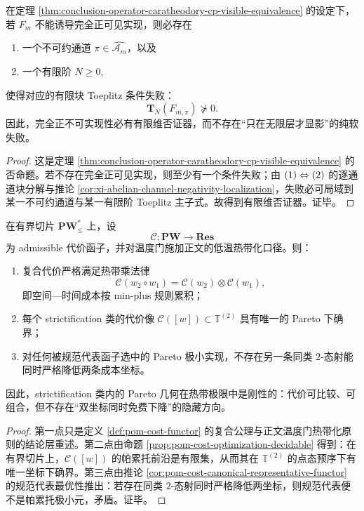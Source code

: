 \begin{corollary}[完全正不可实现性的有限维否证器]\label{cor:conclusion-cp-visible-nonrealizability-has-finite-refuter}
在定理 \ref{thm:conclusion-operator-caratheodory-cp-visible-equivalence} 的设定下，若 \(F_m\) 不能诱导完全正可见实现，则必存在
\begin{enumerate}
  \item 一个不可约通道 \(\pi\in\widehat{\mathcal A_m}\)，以及
  \item 一个有限阶 \(N\ge 0\),
\end{enumerate}
使得对应的有限块 Toeplitz 条件失败：
\[
\mathbf T_N(F_{m,\pi})\not\succeq 0.
\]
因此，完全正不可实现性必有有限维否证器，而不存在“只在无限层才显影”的纯软失败。
\end{corollary}
\begin{proof}
这是定理 \ref{thm:conclusion-operator-caratheodory-cp-visible-equivalence} 的否命题。若不存在完全正可见实现，则至少有一个条件失败；由 \(\textup{(1)}\Leftrightarrow\textup{(2)}\) 的逐通道块分解与推论 \ref{cor:xi-abelian-channel-negativity-localization}，失败必可局域到某一不可约通道与某一有限阶 Toeplitz 主子式。故得到有限维否证器。证毕。
\end{proof}

\begin{theorem}\label{thm:conclusion-tropical-pareto-rigidity-on-bounded-slice}
在有界切片 \(\mathbf{PW}^{\ast}_{\le}\) 上，设
\[
\mathcal C:\mathbf{PW}\to\mathbf{Res}
\]
为 admissible 代价函子，并对温度门施加正文的低温热带化口径。则：
\begin{enumerate}
  \item 复合代价严格满足热带乘法律
  \[
  \mathcal C(w_2\circ w_1)=\mathcal C(w_2)\otimes \mathcal C(w_1),
  \]
  即空间—时间成本按 min-plus 规则累积；
  \item 每个 strictification 类的代价像 \(\mathcal C([w])\subset\mathbb T^{(2)}\) 具有唯一的 Pareto 下确界；
  \item 对任何被规范代表函子选中的 Pareto 极小实现，不存在另一条同类 \(2\)-态射能同时严格降低两条成本坐标。
\end{enumerate}
因此，strictification 类内的 Pareto 几何在热带极限中是刚性的：代价可比较、可组合，但不存在“双坐标同时免费下降”的隐藏方向。
\end{theorem}
\begin{proof}
第一点只是定义 \ref{def:pom-cost-functor} 的复合公理与正文温度门热带化原则的结论层重述。第二点由命题 \ref{prop:pom-cost-optimization-decidable} 得到：在有界切片上，\(\mathcal C([w])\) 的帕累托前沿是有限集，从而其在 \(\mathbb T^{(2)}\) 的点态预序下有唯一坐标下确界。第三点由推论 \ref{cor:pom-cost-canonical-representative-functor} 的规范代表最优性推出：若存在同类 \(2\)-态射同时严格降低两坐标，则规范代表便不是帕累托极小元，矛盾。证毕。
\end{proof}

